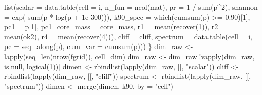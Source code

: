 \documentclass[
  11pt,
]{article}
\newenvironment{Shaded}{\begin{snugshade}}{\end{snugshade}}
\newcommand{\AttributeTok}[1]{\textcolor[rgb]{0.77,0.63,0.00}{#1}}
\newcommand{\DecValTok}[1]{\textcolor[rgb]{0.00,0.00,0.81}{#1}}
\newcommand{\FloatTok}[1]{\textcolor[rgb]{0.00,0.00,0.81}{#1}}
\newcommand{\FunctionTok}[1]{\textcolor[rgb]{0.00,0.00,0.00}{#1}}
\newcommand{\NormalTok}[1]{#1}
\newcommand{\OtherTok}[1]{\textcolor[rgb]{0.56,0.35,0.01}{#1}}
\newcommand{\SpecialCharTok}[1]{\textcolor[rgb]{0.00,0.00,0.00}{#1}}
\newcommand{\StringTok}[1]{\textcolor[rgb]{0.31,0.60,0.02}{#1}}
\begin{document}
\begin{Shaded}
\begin{Highlighting}[]
  \FunctionTok{list}\NormalTok{(}\AttributeTok{scalar =} \FunctionTok{data.table}\NormalTok{(}\AttributeTok{cell =}\NormalTok{ i, }\AttributeTok{n\_fun =} \FunctionTok{ncol}\NormalTok{(mat),}
                           \AttributeTok{pr =} \DecValTok{1} \SpecialCharTok{/} \FunctionTok{sum}\NormalTok{(p}\SpecialCharTok{\^{}}\DecValTok{2}\NormalTok{),}
                           \AttributeTok{shannon =} \FunctionTok{exp}\NormalTok{(}\SpecialCharTok{{-}}\FunctionTok{sum}\NormalTok{(p }\SpecialCharTok{*} \FunctionTok{log}\NormalTok{(p }\SpecialCharTok{+} \FloatTok{1e{-}300}\NormalTok{))),}
                           \AttributeTok{k90\_spec =} \FunctionTok{which}\NormalTok{(}\FunctionTok{cumsum}\NormalTok{(p) }\SpecialCharTok{\textgreater{}=} \FloatTok{0.90}\NormalTok{)[}\DecValTok{1}\NormalTok{],}
                           \AttributeTok{pc1 =}\NormalTok{ p[}\DecValTok{1}\NormalTok{], }\AttributeTok{pc1\_core\_mass =}\NormalTok{ core\_mass,}
                           \AttributeTok{r1 =} \FunctionTok{mean}\NormalTok{(}\FunctionTok{recover}\NormalTok{(}\DecValTok{1}\NormalTok{)), }\AttributeTok{r2 =} \FunctionTok{mean}\NormalTok{(ok2),}
                           \AttributeTok{r4 =} \FunctionTok{mean}\NormalTok{(}\FunctionTok{recover}\NormalTok{(}\DecValTok{4}\NormalTok{))),}
       \AttributeTok{cliff =}\NormalTok{ cliff,}
       \AttributeTok{spectrum =} \FunctionTok{data.table}\NormalTok{(}\AttributeTok{cell =}\NormalTok{ i, }\AttributeTok{pc =} \FunctionTok{seq\_along}\NormalTok{(p), }\AttributeTok{cum\_var =} \FunctionTok{cumsum}\NormalTok{(p)))}
\NormalTok{\}}
\NormalTok{dim\_raw }\OtherTok{\textless{}{-}} \FunctionTok{lapply}\NormalTok{(}\FunctionTok{seq\_len}\NormalTok{(}\FunctionTok{nrow}\NormalTok{(fgrid)), cell\_dim)}
\NormalTok{dim\_raw }\OtherTok{\textless{}{-}}\NormalTok{ dim\_raw[}\SpecialCharTok{!}\FunctionTok{vapply}\NormalTok{(dim\_raw, is.null, }\FunctionTok{logical}\NormalTok{(}\DecValTok{1}\NormalTok{))]}
\NormalTok{dimen }\OtherTok{\textless{}{-}} \FunctionTok{rbindlist}\NormalTok{(}\FunctionTok{lapply}\NormalTok{(dim\_raw, }\StringTok{\textasciigrave{}}\AttributeTok{[[}\StringTok{\textasciigrave{}}\NormalTok{, }\StringTok{"scalar"}\NormalTok{))}
\NormalTok{cliff }\OtherTok{\textless{}{-}} \FunctionTok{rbindlist}\NormalTok{(}\FunctionTok{lapply}\NormalTok{(dim\_raw, }\StringTok{\textasciigrave{}}\AttributeTok{[[}\StringTok{\textasciigrave{}}\NormalTok{, }\StringTok{"cliff"}\NormalTok{))}
\NormalTok{spectrum }\OtherTok{\textless{}{-}} \FunctionTok{rbindlist}\NormalTok{(}\FunctionTok{lapply}\NormalTok{(dim\_raw, }\StringTok{\textasciigrave{}}\AttributeTok{[[}\StringTok{\textasciigrave{}}\NormalTok{, }\StringTok{"spectrum"}\NormalTok{))}
\NormalTok{dimen }\OtherTok{\textless{}{-}} \FunctionTok{merge}\NormalTok{(dimen, k90, }\AttributeTok{by =} \StringTok{"cell"}\NormalTok{)}


\end{Highlighting}
\end{Shaded}
\end{document}
